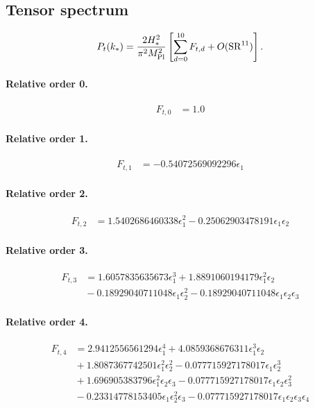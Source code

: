 \documentclass[10pt]{article}
\begin{document}
\subsection{Tensor spectrum}
\[P_t(k_*)=\frac{2H_*^2}{\pi^2M_{\rm Pl}^2}\left[\sum_{d=0}^{10}F_{t,d}+O(\mathrm{SR}^{11})\right].\]
\paragraph{Relative order 0.}
\begin{align*}
F_{t,0} &= 1.0
\end{align*}

\paragraph{Relative order 1.}
\begin{align*}
F_{t,1} &=  - 0.54072569092296 \epsilon_{1}
\end{align*}

\paragraph{Relative order 2.}
\begin{align*}
F_{t,2} &= 1.5402686460338 \epsilon_{1}^{2} - 0.25062903478191 \epsilon_{1} \epsilon_{2}
\end{align*}

\paragraph{Relative order 3.}
\begin{align*}
F_{t,3} &= 1.6057835635673 \epsilon_{1}^{3} + 1.8891060194179 \epsilon_{1}^{2} \epsilon_{2} \\
&{}  - 0.18929040711048 \epsilon_{1} \epsilon_{2}^{2} - 0.18929040711048 \epsilon_{1} \epsilon_{2} \epsilon_{3}
\end{align*}

\paragraph{Relative order 4.}
\begin{align*}
F_{t,4} &= 2.9412556561294 \epsilon_{1}^{4} + 4.0859368676311 \epsilon_{1}^{3} \epsilon_{2} \\
&{}  + 1.8087367742501 \epsilon_{1}^{2} \epsilon_{2}^{2} - 0.077715927178017 \epsilon_{1} \epsilon_{2}^{3} \\
&{}  + 1.696905383796 \epsilon_{1}^{2} \epsilon_{2} \epsilon_{3} - 0.077715927178017 \epsilon_{1} \epsilon_{2} \epsilon_{3}^{2} \\
&{}  - 0.23314778153405 \epsilon_{1} \epsilon_{2}^{2} \epsilon_{3} - 0.077715927178017 \epsilon_{1} \epsilon_{2} \epsilon_{3} \epsilon_{4}
\end{align*}
\end{document}
